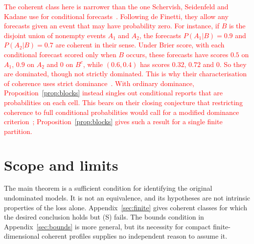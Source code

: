 \documentclass[11pt]{article}
\theoremstyle{definition}
\theoremstyle{remark}
\begin{document}
\textcolor{red}{The coherent class here is narrower than the one Schervish, Seidenfeld and Kadane use for conditional forecasts~\cite{SSK09}. Following de Finetti, they allow any forecasts given an event that may have probability zero. For instance, if $B$ is the disjoint union of nonempty events $A_1$ and $A_2$, the forecasts $P(A_1|B)=0.9$ and $P(A_2|B)=0.7$ are coherent in their sense. Under Brier score, with each conditional forecast scored only when $B$ occurs, these forecasts have scores $0.5$ on $A_1$, $0.9$ on $A_2$ and $0$ on $B^c$, while $(0.6,0.4)$ has scores $0.32$, $0.72$ and $0$. So they are dominated, though not strictly dominated. This is why their characterisation of coherence uses strict dominance~\cite[Theorem~1]{SSK09}. With ordinary dominance, Proposition~\ref{prop:blocks} instead singles out conditional reports that are probabilities on each cell. This bears on their closing conjecture that restricting coherence to full conditional probabilities would call for a modified dominance criterion~\cite[Section~6]{SSK09}; Proposition~\ref{prop:blocks} gives such a result for a single finite partition.}


\section{Scope and limits}\label{sec:scope}
The main theorem is a sufficient condition for identifying the original undominated models. It is not an equivalence, and its hypotheses are not intrinsic properties of the loss alone. Appendix~\ref{sec:finite} gives coherent classes for which the desired conclusion holds but (S) fails. The bounds condition in Appendix~\ref{sec:bounds} is more general, but its necessity for compact finite-dimensional coherent profiles supplies no independent reason to assume it.
\end{document}
